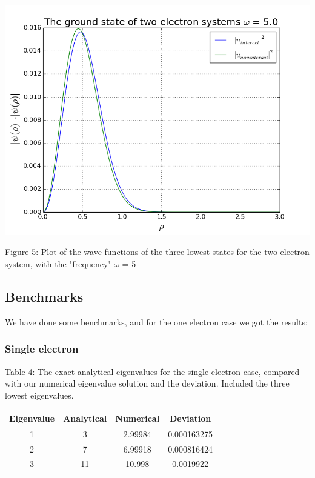 \documentclass[norsk,a4paper,12pt]{article}
\begin{document}
\includegraphics[scale=0.6]{wavefunc_two_omega=5}\par
\vspace{1mm}
Figure 5: Plot of the wave functions of the three lowest states for the two electron  system, with the "frequency" $\omega$ = 5
\par
\vspace{7mm}

\subsection{Benchmarks}
We have done some benchmarks, and for the one electron case we got the results:
\subsubsection{Single electron}
Table 4: The exact analytical eigenvalues for the single electron case, compared with our numerical eigenvalue solution and the deviation. Included the three lowest eigenvalues.\par
\begin{tabular}{|c|c|c|c|}\hline
     {\bf Eigenvalue} & {\bf Analytical} & {\bf Numerical} & {\bf Deviation}\\ \hline
     1 & 3 & 2.99984 & 0.000163275\\
     2 & 7 & 6.99918 & 0.000816424\\
     3 & 11 & 10.998 & 0.0019922\\ \hline
\end{tabular}\par
\end{document}

